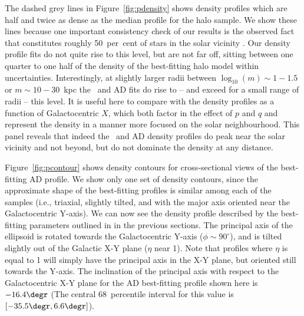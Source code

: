 The dashed grey lines in Figure~\ref{fig:pdensity} shows density profiles which are half and twice as dense as the median profile for the halo sample. We show these lines because one important consistency check of our results is the observed fact that \gse constitutes roughly 50~per~cent of stars in the solar vicinity \parencite{belokurov18,lancaster19,fattahi19}. Our \gse density profile fits do not quite rise to this level, but are not far off, sitting between one quarter to one half of the density of the best-fitting halo model within uncertainties. Interestingly, at slightly larger radii between $\log_{10}(m) \sim 1-1.5 $ or $ m \sim 10-30$~kpc the \eLz\ and AD fits do rise to -- and exceed for a small range of radii -- this level. It is useful here to compare with the density profiles as a function of Galactocentric $X$, which both factor in the effect of $p$ and $q$ and represent the density in a manner more focused on the solar neighbourhood. This panel reveals that indeed the \eLz\ and AD density profiles do peak near the solar vicinity and not beyond, but do not dominate the density at any distance.

Figure~\ref{fig:pcontour} shows density contours for cross-sectional views of the best-fitting AD profile. We show only one set of density contours, since the approximate shape of the best-fitting profiles is similar among each of the samples (i.e., triaxial, slightly tilted, and with the major axis oriented near the Galactocentric Y-axis). We can now see the density profile described by the best-fitting parameters outlined in in the previous sections. The principal axis of the ellipsoid is rotated towards the Galactocentric Y-axis ($\phi \sim 90^{\circ}$), and is tilted slightly out of the Galactic X-Y plane ($\eta$ near 1). Note that profiles where $\eta$ is equal to 1 will simply have the principal axis in the X-Y plane, but oriented still towards the Y-axis. The inclination of the principal axis with respect to the Galactocentric X-Y plane for the AD best-fitting profile shown here is $-16.4\degr$ (The central 68~percentile interval for this value is $[-35.5\degr,6.6\degr]$).

